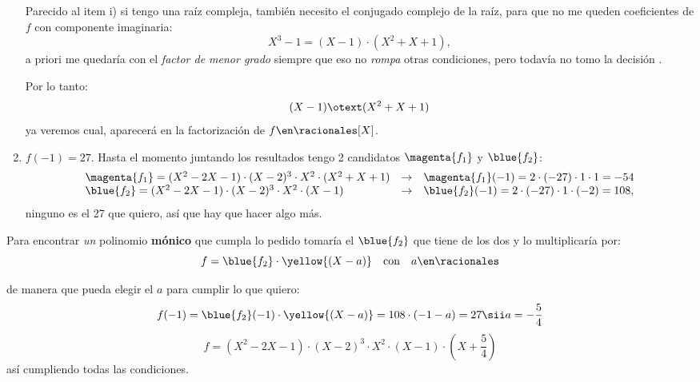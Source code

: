 \begin{enumerate}[label=\roman*)]
        Parecido al item i) si tengo una raíz compleja, también necesito el conjugado complejo de la raíz, para que no me queden
        coeficientes de $f$ con componente imaginaria:
        $$
          X^3 - 1 = (X-1) \cdot (X^2 + X +1),
        $$
        a priori me quedaría con el \textit{factor de menor grado} siempre que eso no \textit{rompa} otras condiciones, pero todavía no tomo
        la decisión .

        Por lo tanto:
        $$
          (X-1) \otext (X^2 + X +1)
        $$
        ya veremos cual, aparecerá en la factorización de $f \en \racionales[X]$.

  \item $f(-1) = 27$. Hasta el momento juntando los resultados tengo 2 candidatos $\magenta{f_1}$ y $\blue{f_2}$:
        $$
          \begin{array}{lcl}
            \magenta{f_1} = (X^2 - 2X - 1)\cdot (X-2)^3 \cdot X^2 \cdot (X^2 + X + 1) & \to & \magenta{f_1}(-1) = 2 \cdot (-27) \cdot 1 \cdot 1 = -54   \\
            \blue{f_2} = (X^2 - 2X - 1)\cdot (X-2)^3 \cdot X^2 \cdot (X-1)            & \to & \blue{f_2}(-1) =  2 \cdot (-27) \cdot 1 \cdot (-2) = 108,
          \end{array}
        $$
        ninguno es el 27 que quiero, así que hay que hacer algo más.
\end{enumerate}

Para encontrar \textit{un} polinomio \textbf{mónico} que cumpla lo pedido tomaría el $\blue{f_2}$ que tiene  de los dos y lo multiplicaría por:
$$
  f = \blue{f_2} \cdot \yellow{(X - a)} \quad \text{con} \quad a \en \racionales
$$

de manera que pueda elegir el $a$ para cumplir lo que quiero:
$$
  f(-1) = \blue{f_2}(-1) \cdot \yellow{(X - a)}  = 108 \cdot (-1 - a) = 27 \sii a = -\frac{5}{4}
$$
$$
  f =  (X^2 - 2X - 1)\cdot (X-2)^3 \cdot X^2 \cdot (X-1) \cdot (X + \frac{5}{4})
$$
así cumpliendo todas las condiciones.

\begin{aportes}
  \item {}
  \item {}
\end{aportes}
